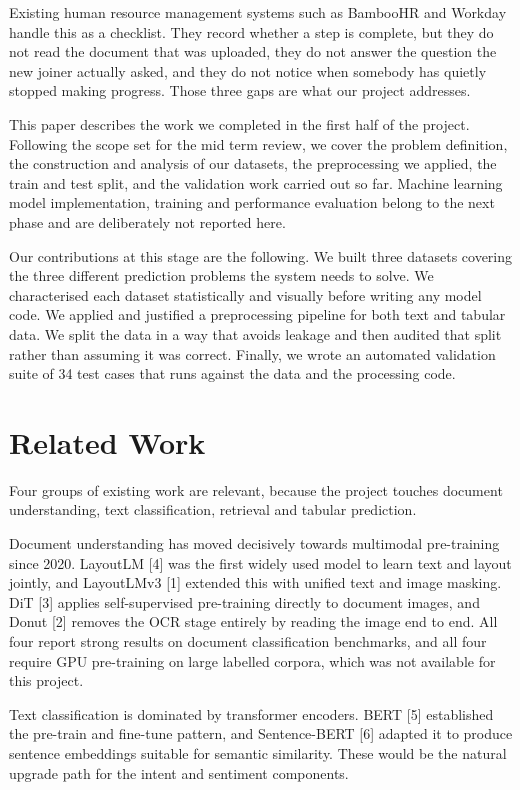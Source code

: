\documentclass[conference]{IEEEtran}
\begin{document}
Existing human resource management systems such as BambooHR and Workday handle this as a checklist. They record whether a step is complete, but they do not read the document that was uploaded, they do not answer the question the new joiner actually asked, and they do not notice when somebody has quietly stopped making progress. Those three gaps are what our project addresses.

This paper describes the work we completed in the first half of the project. Following the scope set for the mid term review, we cover the problem definition, the construction and analysis of our datasets, the preprocessing we applied, the train and test split, and the validation work carried out so far. Machine learning model implementation, training and performance evaluation belong to the next phase and are deliberately not reported here.

Our contributions at this stage are the following. We built three datasets covering the three different prediction problems the system needs to solve. We characterised each dataset statistically and visually before writing any model code. We applied and justified a preprocessing pipeline for both text and tabular data. We split the data in a way that avoids leakage and then audited that split rather than assuming it was correct. Finally, we wrote an automated validation suite of 34 test cases that runs against the data and the processing code.

\section{Related Work}
Four groups of existing work are relevant, because the project touches document understanding, text classification, retrieval and tabular prediction.

Document understanding has moved decisively towards multimodal pre-training since 2020. LayoutLM [4] was the first widely used model to learn text and layout jointly, and LayoutLMv3 [1] extended this with unified text and image masking. DiT [3] applies self-supervised pre-training directly to document images, and Donut [2] removes the OCR stage entirely by reading the image end to end. All four report strong results on document classification benchmarks, and all four require GPU pre-training on large labelled corpora, which was not available for this project.

Text classification is dominated by transformer encoders. BERT [5] established the pre-train and fine-tune pattern, and Sentence-BERT [6] adapted it to produce sentence embeddings suitable for semantic similarity. These would be the natural upgrade path for the intent and sentiment components.
\end{document}

